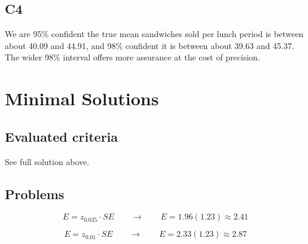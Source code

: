 \begin{ExamProblems}
		\subsection*{C4}
		We are 95\% confident the true mean sandwiches sold per lunch period is between about 40.09 and 44.91, and 98\% confident it is between about 39.63 and 45.37. The wider 98\% interval offers more assurance at the cost of precision.
	\end{ExamProblems}


\section{Minimal Solutions}

\subsection*{Evaluated criteria}
See full solution above.

\subsection*{Problems}
\[E = z_{0.025} \cdot SE \qquad \longrightarrow \qquad E = 1.96(1.23) \approx 2.41\]

\[E = z_{0.01} \cdot SE \qquad \longrightarrow \qquad E = 2.33(1.23) \approx 2.87\]


